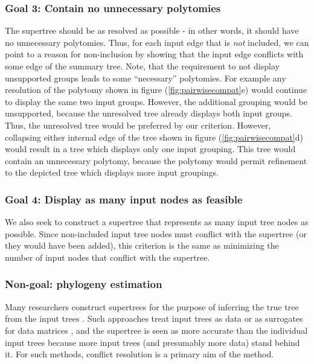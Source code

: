 \documentclass[fleqn,12pt,lineno,english]{wlpeerj}
\begin{document}
\subsubsection{Goal 3: Contain no unnecessary polytomies}

The supertree should be as resolved as possible - in other words,
it should have no unnecessary polytomies. Thus, for each input edge
that is \emph{not} included, we can point to a reason for non-inclusion
by showing that the input edge conflicts with some edge of the summary
tree. Note, that the requirement to not display unsupported groups
leads to some ``necessary'' polytomies. For example any resolution
of the polytomy shown in figure (\ref{fig:pairwisecompat}e) would
continue to display the same two input groups. However, the additional
grouping would be unsupported, because the unresolved tree already
displays both input groups. Thus, the 
unresolved tree would be preferred by our criterion.
However, collapsing either internal edge of the tree shown in figure
(\ref{fig:pairwisecompat}d) would result in a tree which displays
only one input grouping. This tree would contain an unnecessary polytomy,
because the polytomy would permit refinement to the depicted tree
which displays more input groupings.

\subsubsection{Goal 4: Display as many input nodes as feasible}

We also seek to construct a supertree that represents as many input
tree nodes as possible. Since non-included input tree nodes must conflict
with the supertree (or they would have been added), this criterion
is the same as minimizing the number of input nodes that conflict
with the supertree.

\subsubsection{Non-goal: phylogeny estimation}
Many researchers construct supertrees for the purpose of inferring the true tree from the input trees \citep{BinindaEmonds2007b,Davis2014}.  Such approaches treat input trees as data or as surrogates for data matrices \citep{gatesy2004critique}, and the supertree is seen as more accurate than the individual input trees because more input trees (and presumably more data) stand behind it.  For such methods, conflict resolution is a primary aim of the method.
\end{document}
